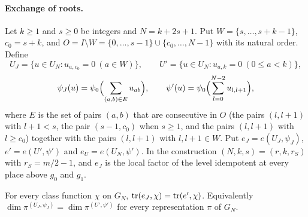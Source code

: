 \paragraph{Exchange of roots.}

Let $k\ge1$ and $s\ge0$ be integers and $N=k+2s+1$. Put $W=\{s,\dots,s+k-1\}$, $c_0=s+k$, and $O=I\setminus W=\{0,\dots,s-1\}\cup\{c_0,\dots,N-1\}$ with its natural order. Define
\[
U_J=\{u\in U_N:u_{a,c_0}=0\ (a\in W)\},\qquad U'=\{u\in U_N:u_{a,k}=0\ (0\le a<k)\},
\]
\[
\psi_J(u)=\psi_0\Bigl(\sum_{(a,b)\in E}u_{ab}\Bigr),\qquad\psi'(u)=\psi_0\Bigl(\sum_{l=0}^{N-2}u_{l,l+1}\Bigr),
\]
where $E$ is the set of pairs $(a,b)$ that are consecutive in $O$ (the pairs $(l,l+1)$ with $l+1<s$, the pair $(s-1,c_0)$ when $s\ge1$, and the pairs $(l,l+1)$ with $l\ge c_0$) together with the pairs $(l,l+1)$ with $l,l+1\in W$. Put $e_J=e(U_J,\psi_J)$, $e'=e(U',\psi')$ and $e_U=e(U_N,\psi')$. In the construction $(N,k,s)=(r,k,r_S)$ with $r_S=m/2-1$, and $e_J$ is the local factor of the level idempotent at every place above $g_0$ and $g_1$.

\begin{theorem}\label{w39:thmA}\label{w2x:exch}
For every class function $\chi$ on $G_N$, $\operatorname{tr}(e_J,\chi)=\operatorname{tr}(e',\chi)$. Equivalently $\dim\pi^{(U_J,\psi_J)}=\dim\pi^{(U',\psi')}$ for every representation $\pi$ of $G_N$.
\end{theorem}

